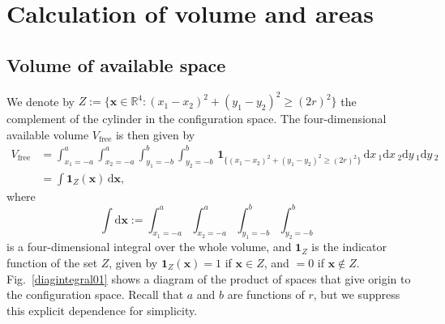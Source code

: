 \documentclass[superscriptaddress,pre,reprint,showpacs,onecolumn]{revtex4-1}
\newcommand{\rd}[1]{\mathrm{d}{#1} \,}
\newcommand{\indicatorsymbol}{\mathbf{1}}
\newcommand{\indicator}[1]{\indicatorsymbol_{ \{   #1 \} } }
\begin{document}
\section{Calculation of volume and areas}


\subsection{Volume of available space}


We denote by $Z := \{ \mathbf{x} \in \mathbb{R}^4: (x_1-x_2)^2 + (y_1-y_2)^2 \ge (2r)^2 \}$ 
the complement of the cylinder in the configuration space.
The four-dimensional available volume $V_\text{free}$ is then given by
\begin{align}\label{volindic}
V_\text{free} &= 
\int_{x_1 = -a}^a  \int_{x_2 = -a}^a  \int_{y_1 = -b}^b \int_{y_2 = -b}^b
 \, \indicator{ (x_1-x_2)^2 + (y_1-y_2)^2 \ge (2r)^2 } \,
\rd x_1 \rd x_2 \rd y_1 \rd y_2 \\
&=
\int \indicatorsymbol_Z(\mathbf{x}) \, \mathrm{d} \mathbf{x},
\end{align}
where
$$ \int  \mathrm{d} \mathbf{x} :=  \int_{x_1 = -a}^a  \int_{x_2 = -a}^a  \int_{y_1 = -b}^b \int_{y_2 = -b}^b$$
is a four-dimensional integral over the whole volume, and 
$\indicatorsymbol_Z$ is the indicator function of the set $Z$, 
given by $\indicatorsymbol_Z (\mathbf{x}) = 1$ if $\mathbf{x} \in Z$, and $=0$ if $\mathbf{x} \notin Z$.
Fig.~\ref{diagintegral01} shows a diagram of the product of
spaces that give origin to the configuration space.
Recall that $a$ and $b$ are functions of $r$, 
but we suppress this explicit dependence for simplicity.
\end{document}
